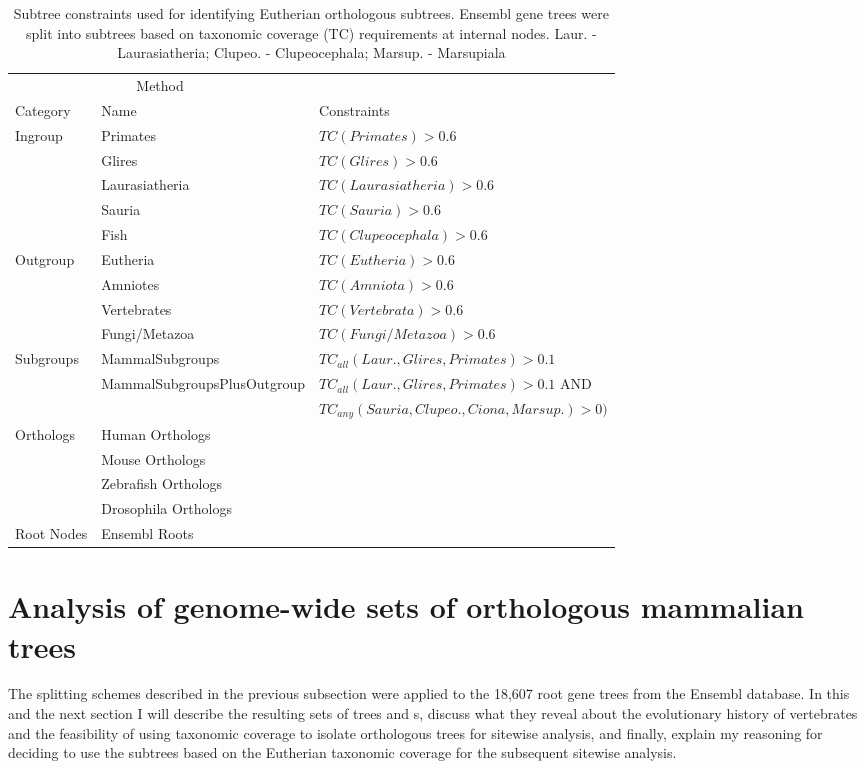 \begin{table}[ht] \footnotesize
\centering
\begin{tabular}{@{}lll@{}} \toprule
\multicolumn{2}{c}{Method} \\ \cmidrule(r){1-2}
   Category & Name & Constraints \\ \midrule
Ingroup & Primates & $TC(Primates) > 0.6$ \\
 &   Glires &  $TC(Glires) > 0.6$ \\
 &   Laurasiatheria & $TC(Laurasiatheria) > 0.6$ \\
 &   Sauria & $TC(Sauria) > 0.6$ \\
 &   Fish & $TC(Clupeocephala) > 0.6$ \\
Outgroup &  Eutheria & $TC(Eutheria) > 0.6$ \\
 &   Amniotes & $TC(Amniota) > 0.6$\\
 &   Vertebrates & $TC(Vertebrata) > 0.6$\\
 &   Fungi/Metazoa & $TC(Fungi/Metazoa) > 0.6$\\
Subgroups &  MammalSubgroups & $TC_{all}(Laur., Glires, Primates) > 0.1$\\
 &   \scriptsize{MammalSubgroupsPlusOutgroup} & $TC_{all}(Laur., Glires, Primates) > 0.1$ AND \\
 &    & $TC_{any}(Sauria, Clupeo., Ciona, Marsup.) > 0)$ \\
Orthologs & Human Orthologs & \\
 &   Mouse Orthologs &  \\
 &   Zebrafish Orthologs &  \\
 &   Drosophila Orthologs &  \\
Root Nodes & Ensembl Roots &  \\
\bottomrule
\end{tabular}
\caption{Subtree constraints used for identifying Eutherian
  orthologous subtrees. Ensembl gene trees were split into subtrees
  based on taxonomic coverage (TC) requirements at internal
  nodes. Laur. - Laurasiatheria; Clupeo. - Clupeocephala; Marsup. -
  Marsupiala}
\label{subtree_constraints}
\end{table}

\section{Analysis of genome-wide sets of orthologous mammalian trees}

The \subtr splitting schemes described in the previous subsection were
applied to the 18,607 root gene trees from the Ensembl database. In
this and the next section I will describe the resulting sets of trees
and \subtr{}s, discuss what they reveal about the evolutionary history
of vertebrates and the feasibility of using taxonomic coverage to
isolate orthologous trees for sitewise analysis, and finally, explain
my reasoning for deciding to use the subtrees based on the Eutherian
taxonomic coverage for the subsequent sitewise analysis.

